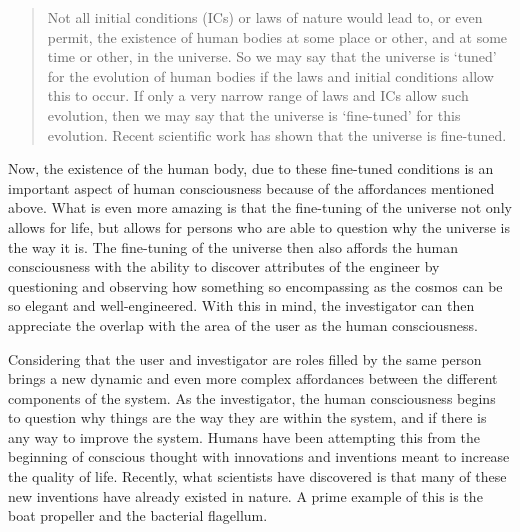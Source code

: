 \begin{quote}
Not all initial conditions (ICs) or laws of nature
would lead to, or even permit, the existence of human bodies at some
place or other, and at some time or other, in the universe. So we may
say that the universe is `tuned' for the evolution of human bodies if
the laws and initial conditions allow this to occur. If only a very
narrow range of laws and ICs allow such evolution, then we may say that
the universe is `fine-tuned' for this evolution. Recent scientific work
has shown that the universe is fine-tuned. \citep{swinburne2004}
\end{quote}

Now, the existence of the human body, due to these fine-tuned conditions
is an important aspect of human consciousness because of the
affordances mentioned above. What is even more amazing is that the fine-tuning 
of the universe not only allows for life, but allows for persons
who are able to question why the universe is the way it is. The
fine-tuning of the universe then also affords the human consciousness
with the ability to discover attributes of the engineer by questioning
and observing how something so encompassing as the cosmos can be so
elegant and well-engineered. With this in mind, the investigator can
then appreciate the overlap with the area of the user as the human
consciousness.

Considering that the user and investigator are roles filled by the same
person brings a new dynamic and even more complex affordances between
the different components of the system. As the investigator, the human
consciousness begins to question why things are the way they are within
the system, and if there is any way to improve the system. Humans have
been attempting this from the beginning of conscious thought with
innovations and inventions meant to increase the quality of life.
Recently, what scientists have discovered is that many of these new
inventions have already existed in nature. A prime example of this is
the boat propeller and the bacterial flagellum. 

